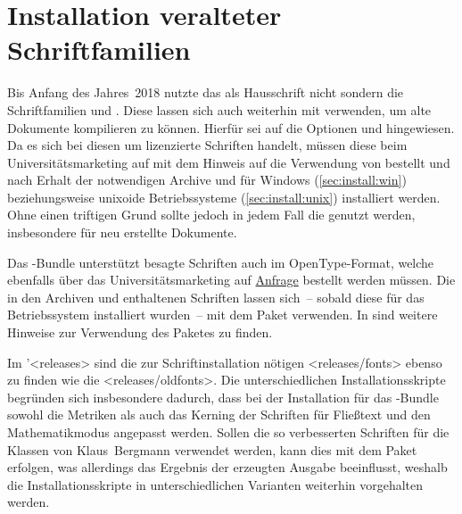\section{Installation veralteter Schriftfamilien}
%
%
%
%
Bis Anfang des Jahres~2018 nutzte das \TUDCD als Hausschrift nicht \OpenSans 
sondern die Schriftfamilien \Univers und \DIN. Diese lassen sich auch weiterhin 
mit \TUDScript verwenden, um alte Dokumente kompilieren zu können. Hierfür sei 
auf die Optionen  und  hingewiesen. 
Da es sich bei diesen um lizenzierte Schriften handelt, müssen diese beim 
Universitätsmarketing auf  mit dem 
Hinweis auf die Verwendung von  bestellt und nach Erhalt der 
notwendigen Archive  und  für 
Windows (\autoref{sec:install:win}) beziehungsweise unixoide Betriebssysteme 
(\autoref{sec:install:unix}) installiert werden. Ohne einen triftigen Grund 
sollte jedoch in jedem Fall die \OpenSans genutzt werden, insbesondere für neu 
erstellte Dokumente.

Das \TUDScript-Bundle unterstützt besagte Schriften auch im OpenType-Format, 
welche ebenfalls über das Universitätsmarketing auf 
\href{https://tu-dresden.de/cd}{Anfrage} bestellt werden müssen. Die in den 
Archiven  und  enthaltenen 
Schriften lassen sich~-- sobald diese für das Betriebssystem installiert 
wurden~-- mit dem Paket  verwenden. In  
sind weitere Hinweise zur Verwendung des Paketes  zu finden.

Im \GitHubRepo'<releases> sind die zur Schriftinstallation nötigen 
<releases/fonts> ebenso zu finden wie die
<releases/oldfonts>. Die 
unterschiedlichen Installationsskripte begründen sich insbesondere dadurch, 
dass bei der Installation für das \TUDScript-Bundle sowohl die Metriken als 
auch das Kerning der Schriften für Fließtext und den Mathematikmodus angepasst 
werden. Sollen die so verbesserten Schriften für die Klassen von Klaus~Bergmann 
verwendet werden, kann dies mit dem Paket  erfolgen, 
was allerdings das Ergebnis der erzeugten Ausgabe beeinflusst, weshalb die 
Installationsskripte in unterschiedlichen Varianten weiterhin vorgehalten 
werden.

